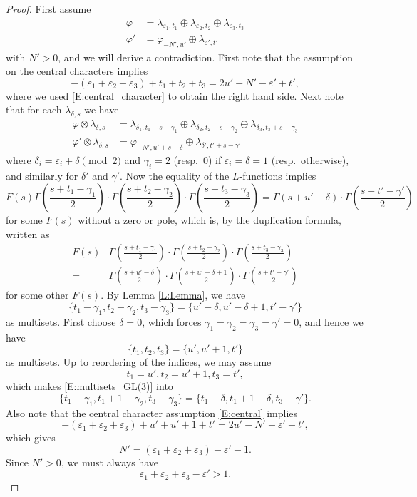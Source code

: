 \documentclass[11pt]{amsart}
\theoremstyle{plain}
\theoremstyle{definition}
\numberwithin{equation}{section}
\newcommand{\la}{\lambda}
\newcommand{\ep}{\varepsilon}
\begin{document}
\begin{proof}
First assume
\begin{align}
\label{E:1+1+1}\varphi&=\la_{\ep_1, t_1}\oplus\la_{\ep_2, t_2}\oplus\la_{\ep_3, t_3}\\
\label{E:2+1}\varphi'&=\varphi_{-N', u'}\oplus\la_{\ep', t'}
\end{align}
with $N'>0$, and we will derive a contradiction. First note that the
assumption on the central characters implies
\begin{equation}\label{E:central}
-(\ep_1+\ep_2+\ep_3)+t_1+t_2+t_3=2u'-N'-\ep'+t',
\end{equation}
where we used \eqref{E:central_character} to obtain the right hand side.
Next note that for each $\la_{\delta, s}$ we have 
\begin{align*}
\varphi\otimes\la_{\delta, s}
&=\la_{\delta_1, t_1+s-\gamma_1}\oplus\la_{\delta_2,
  t_2+s-\gamma_2}\oplus \la_{\delta_3, t_3+s-\gamma_3}\\
\varphi'\otimes\la_{\delta,s}
&=\varphi_{-N',u'+s-\delta}\oplus\la_{\delta', t'+s-\gamma'}
\end{align*}
where $\delta_i=\ep_i+\delta\pmod{2}$ and $\gamma_i=2$ (resp.\ 0) if
$\ep_i=\delta=1$ (resp.\ otherwise), and similarly for $\delta'$ and
$\gamma'$.
Now the equality of the $L$-functions implies
\[
F(s)\Gamma\left(\frac{s+t_1-\gamma_1}{2}\right)\cdot
  \Gamma\left(\frac{s+t_2-\gamma_2}{2}\right)\cdot
\Gamma\left(\frac{s+t_3-\gamma_3}{2}\right)
=\Gamma(s+u'-\delta)\cdot \Gamma\left(\frac{s+t'-\gamma'}{2}\right)
\]
for some $F(s)$ without a zero or pole, which is, by the duplication formula, written as
\begin{align*}
F(s)&\Gamma\left(\frac{s+t_1-\gamma_1}{2}\right)\cdot
  \Gamma\left(\frac{s+t_2-\gamma_2}{2}\right)\cdot
\Gamma\left(\frac{s+t_3-\gamma_3}{2}\right)\\
=&\Gamma\left(\frac{s+u'-\delta}{2}\right)\cdot
\Gamma\left(\frac{s+u'-\delta+1}{2}\right)\cdot
\Gamma\left(\frac{s+t'-\gamma'}{2}\right)
\end{align*}
for some other $F(s)$. By Lemma \ref{L:Lemma}, we have
\begin{equation}\label{E:multisets_GL(3)}
\{t_1-\gamma_1, t_2-\gamma_2, t_3-\gamma_3\}
=\{u'-\delta, u'-\delta+1, t'-\gamma'\}
\end{equation}
as multisets. First choose $\delta=0$, which forces
$\gamma_1=\gamma_2=\gamma_3=\gamma'=0$, and hence we have
\[
\{t_1, t_2, t_3\}=\{u', u'+1, t'\}
\]
as multisets. Up to reordering of the indices, we may assume 
\[
t_1=u', t_2=u'+1, t_3=t',
\]
which makes \eqref{E:multisets_GL(3)} into
\begin{equation}\label{E:multisets_GL(3)-1}
\{t_1-\gamma_1, t_1+1-\gamma_2, t_3-\gamma_3\}
=\{t_1-\delta, t_1+1-\delta, t_3-\gamma'\}.
\end{equation}
Also note that the central character assumption \eqref{E:central} implies
\[
-(\ep_1+\ep_2+\ep_3)+u'+u'+1+t'=2u'-N'-\ep'+t',
\]
which gives
\[
N'=(\ep_1+\ep_2+\ep_3)-\ep'-1.
\]
Since $N'>0$, we must always have
\begin{equation}\label{E:epsilon}
\ep_1+\ep_2+\ep_3-\ep'>1.
\end{equation}


\end{proof}
\end{document}
